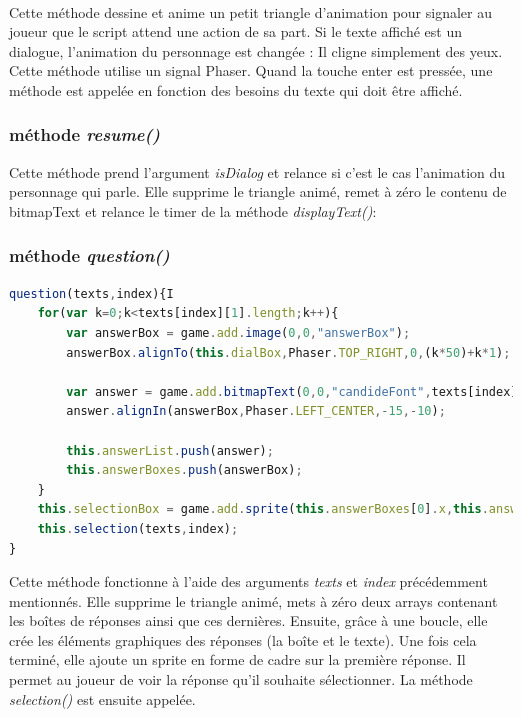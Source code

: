 \documentclass[11pt]{article}
\begin{document}
\paragraph{}
Cette méthode dessine et anime un petit triangle d'animation pour signaler au joueur que le script attend une action de sa part. Si le texte affiché est un dialogue, l'animation du personnage est changée : Il cligne simplement des yeux. Cette méthode utilise un signal Phaser. Quand la touche enter est pressée, une méthode est appelée en fonction des besoins du texte qui doit être affiché.
\subsubsection{méthode \textit{resume()}}
Cette méthode prend l'argument \textit{isDialog} et relance si c'est le cas l'animation du personnage qui parle. Elle supprime le triangle animé, remet à zéro le contenu de bitmapText et relance le timer de la méthode \textit{displayText()}:

\subsubsection{méthode \textit{question()}}
\begin{lstlisting}[language=JavaScript]   
question(texts,index){I
    for(var k=0;k<texts[index][1].length;k++){
        var answerBox = game.add.image(0,0,"answerBox");
        answerBox.alignTo(this.dialBox,Phaser.TOP_RIGHT,0,(k*50)+k*1);
        
        var answer = game.add.bitmapText(0,0,"candideFont",texts[index][1][k],50);
        answer.alignIn(answerBox,Phaser.LEFT_CENTER,-15,-10);
        
        this.answerList.push(answer);
        this.answerBoxes.push(answerBox);
    }
    this.selectionBox = game.add.sprite(this.answerBoxes[0].x,this.answerBoxes[0].y,"selection");
    this.selection(texts,index);
}
\end{lstlisting} 
Cette méthode fonctionne à l'aide des arguments \textit{texts} et \textit{index} précédemment mentionnés. Elle supprime le triangle animé, mets à zéro deux arrays contenant les boîtes de réponses ainsi que ces dernières. Ensuite, grâce à une boucle, elle crée les éléments graphiques des réponses (la boîte et le texte). Une fois cela terminé, elle ajoute un sprite en forme de cadre sur la première réponse. Il permet au joueur de voir la réponse qu'il souhaite sélectionner. La méthode \textit{selection()} est ensuite appelée.
\end{document}
